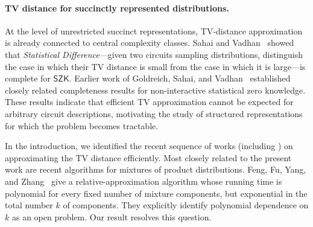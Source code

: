 \documentclass{article}
\newcommand{\ignore}[1]{}
\begin{document}
\paragraph{TV distance for succinctly represented distributions.}
At the level of unrestricted succinct representations, TV-distance
approximation is already connected to central complexity classes.
Sahai and Vadhan~\cite{SV03} showed that \emph{Statistical Difference}---given two circuits sampling distributions, distinguish the case in which
their TV distance is small from the case in which it is  large---is complete
for $\mathsf{SZK}$. Earlier work of Goldreich, Sahai, and
Vadhan~\cite{GoldreichSV99} established closely related completeness results for
non-interactive statistical zero knowledge. These results indicate that
efficient TV approximation cannot be expected for arbitrary circuit
descriptions, motivating the study of structured representations for
which the problem becomes tractable. 

\ignore{For product distributions, Bhattacharyya et al.~\cite{BGMMPV23} proved
that exact TV computation is $\#\mathsf{P}$-complete, while also giving
approximation algorithms for restricted cases. Feng, Guo, Jerrum, and
Wang~\cite{FGJW23} subsequently gave an FPRAS for arbitrary product
distributions. Their algorithm uses a coupling-based importance-sampling
argument and remains polynomial-time even when the TV distance is very
small. Feng, Liu, and Liu~\cite{FLL24} gave a deterministic FPTAS based on
sparsification of the likelihood-ratio distribution, and extended their
techniques to Markov chains. Bhattacharyya et
al.~\cite{BGMMPV24} established a structure-preserving reduction from
relative TV approximation to probabilistic inference, yielding FPRASs for
same-structure Bayesian networks whenever inference can be performed
efficiently. Feng, Liu, and Yang~\cite{FLY25} obtained
relative-approximation algorithms for several classes of spin systems.}

In the introduction, we identified the recent sequence of works
(including \cite{bhattacharyya2025total, feng2023simple, feng2024soda})
on approximating the TV distance efficiently.
Most closely related to the present work are recent algorithms for
mixtures of product distributions. Feng, Fu, Yang, and
Zhang~\cite{feng2026computing, Fu26} give a relative-approximation algorithm
whose running time is polynomial for every fixed number of mixture
components, but exponential in the total number $k$ of components.
They explicitly identify polynomial dependence
on $k$ as an open problem. Our result resolves this question.
\end{document}
